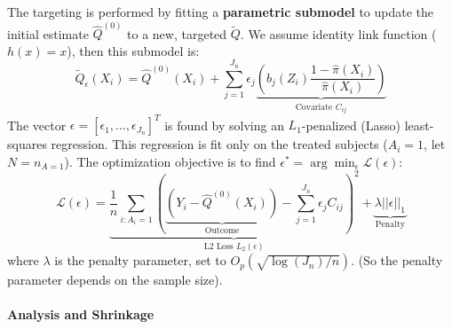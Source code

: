 \documentclass{article} %
\theoremstyle{plain} %
\theoremstyle{definition} %
\theoremstyle{remark} %
\begin{document}
The targeting is performed by fitting a \textbf{parametric submodel} to update the initial estimate $\hat{Q}^{(0)}$ to a new, targeted $\widetilde{Q}$. We assume identity link function ($h(x)=x$), then this submodel is:
$$
\widetilde{Q}_\epsilon(X_i) = \hat{Q}^{(0)}(X_i) + \sum_{j=1}^{J_n} \epsilon_j \underbrace{\left( b_j(Z_i) \frac{1-\hat{\pi}(X_i)}{\hat{\pi}(X_i)} \right)}_{\text{Covariate } C_{ij}}
$$
The vector $\epsilon = [\epsilon_1, \dots, \epsilon_{J_n}]^T$ is found by solving an $L_1$-penalized (Lasso) least-squares regression. This regression is fit only on the treated subjects ($A_i=1$, let $N = n_{A=1}$).
\newline
The optimization objective is to find $\epsilon^* = \arg\min_{\epsilon} \mathcal{L}(\epsilon)$:
$$
\mathcal{L}(\epsilon) = \underbrace{ \frac{1}{n} \sum_{i: A_i=1} \left( \underbrace{(Y_i - \hat{Q}^{(0)}(X_i))}_{\text{Outcome}} - \sum_{j=1}^{J_n} \epsilon_j C_{ij} \right)^2 }_{\text{L2 Loss } L_2(\epsilon)} + \underbrace{ \lambda ||\epsilon||_1 }_{\text{Penalty}}
$$
where $\lambda$ is the penalty parameter, set to $O_p(\sqrt{\log(J_n)/n})$. (So the penalty parameter depends on the sample size).

\paragraph{Analysis and Shrinkage}
\end{document}
